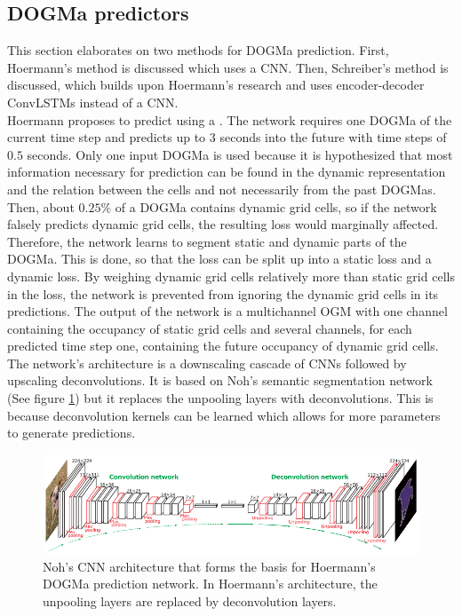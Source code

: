 \subsection{\gls{DOGMa} predictors} \label{subsec:dogma_pred}
This section elaborates on two methods for \gls{DOGMa} prediction. First, Hoermann's \cite{hoermann2018dynamic} method is discussed which uses a \gls{CNN}. Then, Schreiber's \cite{schreiber2019long} method is discussed, which builds upon Hoermann's \cite{hoermann2018dynamic} research and uses encoder-decoder \glspl{ConvLSTM} instead of a \gls{CNN}. \\

Hoermann \cite{hoermann2018dynamic} proposes to predict  using a . The network requires one \gls{DOGMa} of the current time step and predicts up to $3$ seconds into the future with time steps of $0.5$ seconds. Only one input \gls{DOGMa} is used because it is hypothesized that most information necessary for prediction can be found in the dynamic representation and the relation between the cells and not necessarily from the past \glspl{DOGMa}. Then, about $0.25\%$ of a \gls{DOGMa} contains dynamic grid cells, so if the network falsely predicts dynamic grid cells, the resulting loss would marginally affected. Therefore, the network learns to segment static and dynamic parts of the \gls{DOGMa}. This is done, so that the loss can be split up into a static loss and a dynamic loss. By weighing dynamic grid cells relatively more than static grid cells in the loss, the network is prevented from ignoring the dynamic grid cells in its predictions. The output of the network is a multichannel \gls{OGM} with one channel containing the occupancy of static grid cells and several channels, for each predicted time step one, containing the future occupancy of dynamic grid cells. The network's architecture is a downscaling cascade of \glspl{CNN} followed by upscaling deconvolutions. It is based on Noh's \cite{noh2015learning} semantic segmentation network (See figure \ref{fig:cnn_hoermann}) but it replaces the unpooling layers with deconvolutions. This is because deconvolution kernels can be learned which allows for more parameters to generate predictions.  \\

\begin{figure}[h]
	\centering
	\includegraphics[width=0.8\linewidth]{Figures/Methods/Hoermann_CNN}
	\caption{Noh's \cite{noh2015learning} \gls{CNN} architecture that forms the basis for Hoermann's \cite{hoermann2018dynamic} \gls{DOGMa} prediction network. In Hoermann's \cite{hoermann2018dynamic} architecture, the unpooling layers are replaced by deconvolution layers.}
	\label{fig:cnn_hoermann}
\end{figure}

